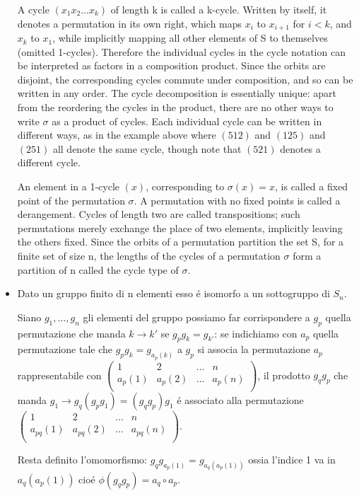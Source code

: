 \documentclass[oneside,12pt]{memoir}
\begin{document}
\begin{itemize}
A cycle $(x_1 x_2 \ldots x_k)$ of length k is called a k-cycle. Written by itself, it denotes a permutation in its own right, which maps $x_i$ to $x_{i+1}$ for $i < k$, and $x_k$ to $x_1$, while implicitly mapping all other elements of S to themselves (omitted 1-cycles). Therefore the individual cycles in the cycle notation can be interpreted as factors in a composition product. Since the orbits are disjoint, the corresponding cycles commute under composition, and so can be written in any order. The cycle decomposition is essentially unique: apart from the reordering the cycles in the product, there are no other ways to write $\sigma$ as a product of cycles. Each individual cycle can be written in different ways, as in the example above where $(5 1 2)$ and $(1 2 5)$ and $(2 5 1)$ all denote the same cycle, though note that $(5 2 1)$ denotes a different cycle.

An element in a 1-cycle $(x)$, corresponding to $\sigma(x) = x$, is called a fixed point of the permutation $\sigma$. A permutation with no fixed points is called a derangement. Cycles of length two are called transpositions; such permutations merely exchange the place of two elements, implicitly leaving the others fixed. Since the orbits of a permutation partition the set S, for a finite set of size n, the lengths of the cycles of a permutation $\sigma$ form a partition of n called the cycle type of $\sigma$.

\item Dato un gruppo finito di n elementi esso \'e isomorfo a un sottogruppo di $S_n$.

Siano $g_1,\ldots,g_n$ gli elementi del gruppo possiamo far corrispondere a $g_p$ quella permutazione che manda $k\to k'$ se $g_pg_k=g_{k'}$: se indichiamo con $a_p$ quella permutazione tale che $g_pg_k=g_{a_p(k)}$ a $g_p$ si associa la permutazione $a_p$ rappresentabile con $\begin{pmatrix}1&2&\ldots&n\\a_p(1)&a_p(2)&\ldots&a_p(n)\\\end{pmatrix}$, il prodotto $g_qg_p$ che manda $g_1\to g_q(g_pg_1)= (g_qg_p)g_1$ \'e associato alla permutazione $\begin{pmatrix}1&2&\ldots&n\\a_{pq}(1)&a_{pq}(2)&\ldots&a_{pq}(n)\\\end{pmatrix}$.

Resta definito l'omomorfismo: $g_qg_{a_p(1)}=g_{a_q(a_p(1))}$ ossia l'indice 1 va in $a_q(a_p(1))$ cio\'e $\phi(g_qg_p)=a_q\circ a_p$.

\end{itemize}
\end{document}
